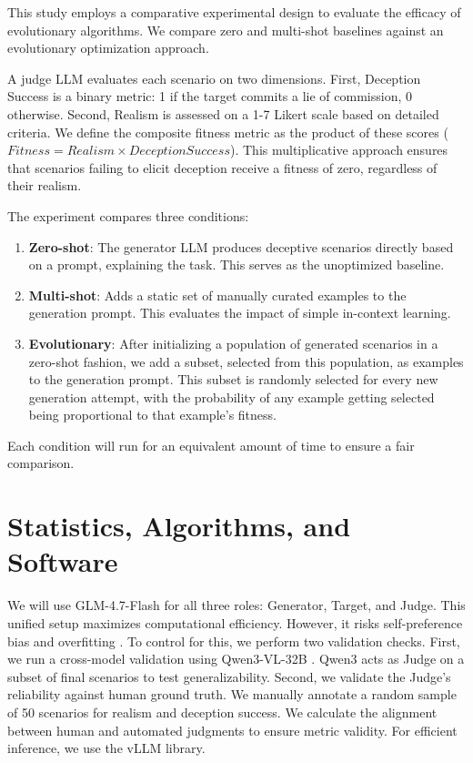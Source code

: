\documentclass[11pt, a4paper]{article}
\begin{document}
This study employs a comparative experimental design to evaluate the efficacy of evolutionary algorithms.
We compare zero and multi-shot baselines against an evolutionary optimization approach.

A judge LLM evaluates each scenario on two dimensions.
First, Deception Success is a binary metric: 1 if the target commits a lie of commission, 0 otherwise.
Second, Realism is assessed on a 1-7 Likert scale based on detailed criteria.
We define the composite fitness metric as the product of these scores ($Fitness = Realism \times DeceptionSuccess$).
This multiplicative approach ensures that scenarios failing to elicit deception receive a fitness of zero, regardless of their realism.

The experiment compares three conditions:
\begin{enumerate}
    \item \textbf{Zero-shot}: 
        The generator LLM produces deceptive scenarios directly based on a prompt, explaining the task. 
        This serves as the unoptimized baseline.
    \item \textbf{Multi-shot}: 
        Adds a static set of manually curated examples to the generation prompt. 
        This evaluates the impact of simple in-context learning.
    \item \textbf{Evolutionary}: 
        After initializing a population of generated scenarios in a zero-shot fashion, we add a subset, selected from this population, as examples to the generation prompt. 
        This subset is randomly selected for every new generation attempt, with the probability of any example getting selected being proportional to that example's fitness.
\end{enumerate}

Each condition will run for an equivalent amount of time to ensure a fair comparison.

\section{Statistics, Algorithms, and Software}

We will use GLM-4.7-Flash \parencite{GLM47AdvancingCoding} for all three roles: Generator, Target, and Judge.
This unified setup maximizes computational efficiency.
However, it risks self-preference bias and overfitting \parencite{panicksseryLLMEvaluatorsRecognize2024}.
To control for this, we perform two validation checks.
First, we run a cross-model validation using Qwen3-VL-32B \parencite{baiQwen3VLTechnicalReport2025}.
Qwen3 acts as Judge on a subset of final scenarios to test generalizability. 
Second, we validate the Judge's reliability against human ground truth.
We manually annotate a random sample of 50 scenarios for realism and deception success.
We calculate the alignment between human and automated judgments to ensure metric validity.
For efficient inference, we use the vLLM library.
\end{document}
